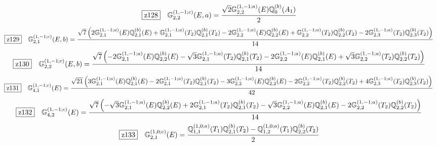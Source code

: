 \documentclass[fleqn,10pt,landscape]{jsarticle}
\begin{document}
\begin{dmath*}
\hspace*{3mm}\fbox{z128}\quad \mathbb{G}_{2,2}^{(1,-1;c)}(E,a)=\frac{\sqrt{2} \mathbb{G}_{2,2}^{(1,-1;a)}(E) \mathbb{Q}_{0}^{(b)}(A_{1})}{2}
\end{dmath*}
\begin{dmath*}
\hspace*{3mm}\fbox{z129}\quad \mathbb{G}_{2,1}^{(1,-1;c)}(E,b)=\frac{\sqrt{7} \left(2 \mathbb{G}_{2,1}^{(1,-1;a)}(E) \mathbb{Q}_{2,1}^{(b)}(E) + \mathbb{G}_{2,1}^{(1,-1;a)}(T_{2}) \mathbb{Q}_{2,1}^{(b)}(T_{2}) - 2 \mathbb{G}_{2,2}^{(1,-1;a)}(E) \mathbb{Q}_{2,2}^{(b)}(E) + \mathbb{G}_{2,2}^{(1,-1;a)}(T_{2}) \mathbb{Q}_{2,2}^{(b)}(T_{2}) - 2 \mathbb{G}_{2,3}^{(1,-1;a)}(T_{2}) \mathbb{Q}_{2,3}^{(b)}(T_{2})\right)}{14}
\end{dmath*}
\begin{dmath*}
\hspace*{3mm}\fbox{z130}\quad \mathbb{G}_{2,2}^{(1,-1;c)}(E,b)=\frac{\sqrt{7} \left(- 2 \mathbb{G}_{2,1}^{(1,-1;a)}(E) \mathbb{Q}_{2,2}^{(b)}(E) - \sqrt{3} \mathbb{G}_{2,1}^{(1,-1;a)}(T_{2}) \mathbb{Q}_{2,1}^{(b)}(T_{2}) - 2 \mathbb{G}_{2,2}^{(1,-1;a)}(E) \mathbb{Q}_{2,1}^{(b)}(E) + \sqrt{3} \mathbb{G}_{2,2}^{(1,-1;a)}(T_{2}) \mathbb{Q}_{2,2}^{(b)}(T_{2})\right)}{14}
\end{dmath*}
\begin{dmath*}
\hspace*{3mm}\fbox{z131}\quad \mathbb{G}_{4,1}^{(1,-1;c)}(E)=\frac{\sqrt{21} \left(3 \mathbb{G}_{2,1}^{(1,-1;a)}(E) \mathbb{Q}_{2,1}^{(b)}(E) - 2 \mathbb{G}_{2,1}^{(1,-1;a)}(T_{2}) \mathbb{Q}_{2,1}^{(b)}(T_{2}) - 3 \mathbb{G}_{2,2}^{(1,-1;a)}(E) \mathbb{Q}_{2,2}^{(b)}(E) - 2 \mathbb{G}_{2,2}^{(1,-1;a)}(T_{2}) \mathbb{Q}_{2,2}^{(b)}(T_{2}) + 4 \mathbb{G}_{2,3}^{(1,-1;a)}(T_{2}) \mathbb{Q}_{2,3}^{(b)}(T_{2})\right)}{42}
\end{dmath*}
\begin{dmath*}
\hspace*{3mm}\fbox{z132}\quad \mathbb{G}_{4,2}^{(1,-1;c)}(E)=\frac{\sqrt{7} \left(- \sqrt{3} \mathbb{G}_{2,1}^{(1,-1;a)}(E) \mathbb{Q}_{2,2}^{(b)}(E) + 2 \mathbb{G}_{2,1}^{(1,-1;a)}(T_{2}) \mathbb{Q}_{2,1}^{(b)}(T_{2}) - \sqrt{3} \mathbb{G}_{2,2}^{(1,-1;a)}(E) \mathbb{Q}_{2,1}^{(b)}(E) - 2 \mathbb{G}_{2,2}^{(1,-1;a)}(T_{2}) \mathbb{Q}_{2,2}^{(b)}(T_{2})\right)}{14}
\end{dmath*}
\begin{dmath*}
\hspace*{3mm}\fbox{z133}\quad \mathbb{G}_{2,1}^{(1,0;c)}(E)=\frac{\mathbb{Q}_{1,1}^{(1,0;a)}(T_{1}) \mathbb{Q}_{2,1}^{(b)}(T_{2}) - \mathbb{Q}_{1,2}^{(1,0;a)}(T_{1}) \mathbb{Q}_{2,2}^{(b)}(T_{2})}{2}
\end{dmath*}
\end{document}

